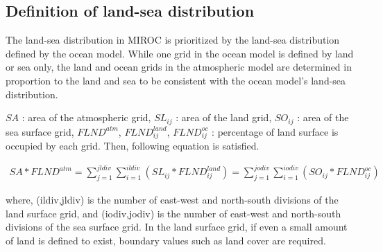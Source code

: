 
\hypertarget{definition-of-land-sea-distribution}{%
\subsection{Definition of land-sea
distribution}\label{definition-of-land-sea-distribution}}

The land-sea distribution in MIROC is prioritized by the land-sea
distribution defined by the ocean model. While one grid in the ocean
model is defined by land or sea only, the land and ocean grids in the
atmospheric model are determined in proportion to the land and sea to be
consistent with the ocean model's land-sea distribution.

\(SA\) : area of the atmospheric grid, \(SL _ {ij}\) : area of the land
grid, \(SO _ {ij}\) : area of the sea surface grid, \(FLND^{atm}\),
\(FLND^{land} _ {ij}\), \(FLND^{oc} _ {ij}\) : percentage of land
surface is occupied by each grid. Then, following equation is satisfied.

\begin{eqnarray} SA*FLND^{atm} = \sum _ {j=1}^{jldiv}\sum _ {i=1}^{ildiv}(SL _ {ij}*FLND^{land} _ {ij}) = \sum _ {j=1}^{jodiv}\sum _ {i=1}^{iodiv}(SO _ {ij}*FLND^{oc } _{ij}) \end{eqnarray}

where, (ildiv,jldiv) is the number of east-west and north-south
divisions of the land surface grid, and (iodiv,jodiv) is the number of
east-west and north-south divisions of the sea surface grid. In the land
surface grid, if even a small amount of land is defined to exist,
boundary values such as land cover are required.

